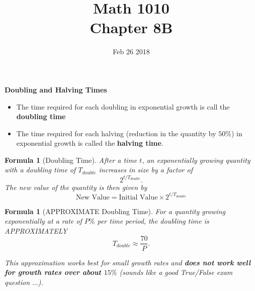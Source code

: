 \documentclass[12pt]{article}
\newtheorem{formula}[theorem]{Formula}
\begin{document}
\title{\bf Math 1010 \\ Chapter 8B\iftoggle{sol}{ Key}{} }
\date{Feb 26 2018}
\maketitle



\renewcommand{\theenumi}{\alph{enumi}}
\renewcommand{\labelenumi}{(\theenumi)}

{\large \bf Doubling and Halving Times}
\begin{itemize}
	\item The time required for each doubling in exponential growth is call the {\bf doubling time}
	\item The time required for each halving (reduction in the quantity by $50\%$) in exponential growth is called the {\bf halving time}.
\end{itemize}

\begin{formula}[Doubling Time]
After a time $t$, an exponentially growing quantity with a doubling time of $T_{double}$ increases in size by a factor of $$2^{t / T_{double}}.$$  The new value of the quantity is then given by
\begin{equation}\label{eq:doubling_time}
	\text{New Value} = \text{Initial Value} \times 2^{t / T_{double}}
\end{equation}

\end{formula}

\begin{formula}[APPROXIMATE Doubling Time]
For a quantity growing exponentially at a rate of $P\%$ per time period, the doubling time is APPROXIMATELY
\begin{equation}\label{eq:approximate_doubling}
	T_{double} \approx \frac{70}{P}.
\end{equation}

This approximation works best for small growth rates and {\bf does not work well for growth rates over about $15\%$} (sounds like a good True/False exam question $\hdots$).

\end{formula}
\end{document}
